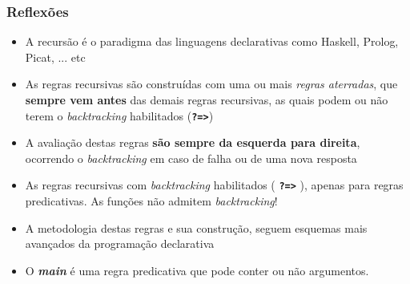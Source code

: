 \begin{frame}[fragile]
\frametitle{Reflexões}


\begin{itemize}
\item A recursão é o paradigma das linguagens declarativas como Haskell, Prolog, Picat, ... etc
 
 \pause
 \item As regras recursivas são construídas com uma ou mais \textit{regras aterradas}, que \textbf{sempre vem antes} das demais
 regras recursivas, as  quais podem ou não terem o \textit{backtracking} habilitados (\textbf{\texttt{?=>}})
 
 
 \pause
 \item A avaliação destas regras \textbf{são sempre da esquerda para direita}, ocorrendo o \textit{backtracking} em caso de falha ou de uma nova resposta
  
  \pause
 \item As regras recursivas com \textit{backtracking} habilitados ( \textbf{\texttt{?=>}} ), apenas
 para regras predicativas. As funções não admitem \textit{backtracking}!
 
  \pause
 \item A metodologia destas regras e sua construção, seguem  esquemas mais
 avançados da programação declarativa
 
   \pause
 \item O \textbf{\textit{main}} é uma regra predicativa que pode conter ou não argumentos.
 
 
\end{itemize}

\end{frame}
